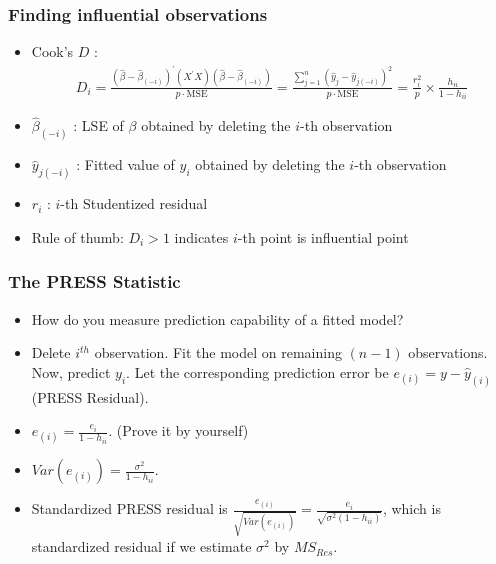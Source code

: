 \documentclass[10pt]{beamer} %
\begin{document}
\begin{frame}
   \frametitle{Finding influential observations}
   \begin{itemize}
      \item Cook's $D$ :
         \begin{align*}
            D_i = \frac{(\hat{\beta} - \hat{\beta}_{(-i)})^\prime (X^\prime X)
            (\hat{\beta} - \hat{\beta}_{(-i)})}{p \cdot \text{MSE}}
            = \frac{\sum_{j=1}^{n} (\hat{y}_j - \hat{y}_{j(-i)})^2}{p \cdot \text{MSE}}
            = \frac{r_i^2}{p} \times \frac{h_{ii}}{1 - h_{ii}}
         \end{align*}
      \item $\widehat{\beta}_{(-i)}$ : LSE of $\beta$ obtained by deleting the
         $i$-th observation
         \smallskip
      \item $\widehat{y}_{j(-i)}$ : Fitted value of $y_i$ obtained by deleting
         the $i$-th observation
         \smallskip
      \item $r_i$ : $i$-th Studentized residual
         \smallskip
      \item Rule of thumb: $D_i>1$ indicates $i$-th point is influential point
   \end{itemize}
\end{frame}

\begin{frame}
   \frametitle{The PRESS Statistic}
   \begin{itemize}
      \item How do you measure prediction capability of a fitted model?
         \smallskip
      \item Delete $i^{th}$ observation. Fit the model on remaining $(n-1)$ observations. Now, predict $y_i$. Let the corresponding prediction error be $e_{(i)}=y-\hat{y}_{(i)}$ (PRESS Residual).
         \vspace{0.25cm}
      \item $e_{(i)}=\frac{e_i}{1-h_{ii}}$. (Prove it by yourself)
         \vspace{0.25cm}
      \item $Var(e_{(i)})=\frac{\sigma^2}{1-h_{ii}}$.
         \smallskip
      \item Standardized PRESS residual is
         $\frac{e_{(i)}}{\sqrt{Var(e_{(i)})}}=\frac{e_i}{\sqrt{\sigma^2(1-h_{ii})}}$,
         which is standardized residual if we estimate $\sigma^2$ by $MS_{Res}$.
   \end{itemize}
\end{frame}
\end{document}
